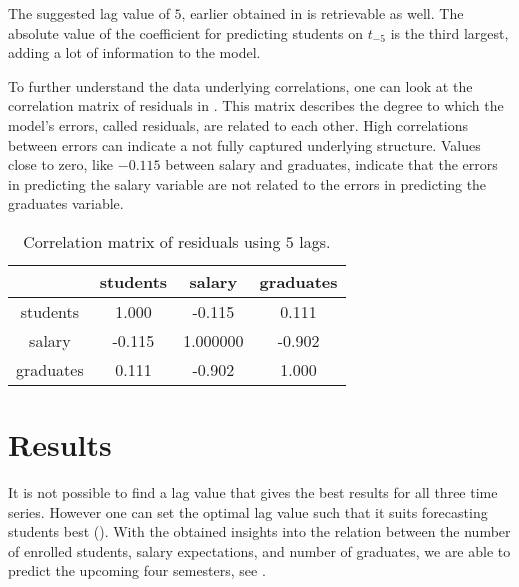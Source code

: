 \documentclass{article}
\theoremstyle{plain}
\theoremstyle{definition}
\theoremstyle{remark}
\begin{document}
The suggested lag value of $5$, earlier obtained in  is retrievable as well.
The absolute value of the coefficient for predicting students on $t_{-5}$ is the third largest, adding
a lot of information to the model.

To further understand the data underlying correlations, one can look at the correlation matrix
of residuals in .
This matrix describes the degree to which the model's errors, called residuals, are related to each other.
High correlations between errors can indicate a not fully captured underlying structure.
Values close to zero, like $-0.115$ between salary and graduates, indicate that the errors
in predicting the salary variable are not related to the errors in predicting the graduates variable.

\begin{table}[H]
    \centering
    \begin{tabular}{c|c|c|c}
        & students & salary & graduates\\
        \hline
        students & 1.000 & -0.115 &  0.111\\
        \hline
        salary & -0.115 & 1.000000 & -0.902\\
        \hline
        graduates & 0.111 & -0.902 &  1.000\\
    \end{tabular}
    \caption{Correlation matrix of residuals using $5$ lags.}
    \label{tab:correlation matrix}
\end{table}

% 

\section{Results}\label{sec:results}
It is not possible to find a lag value that gives the best results for all three time series.
However one can set the optimal lag value such that it suits forecasting students best ().
With the obtained insights into the relation between the number of enrolled students, salary expectations, and number of graduates,
we are able to predict the upcoming four semesters, see .
\end{document}
